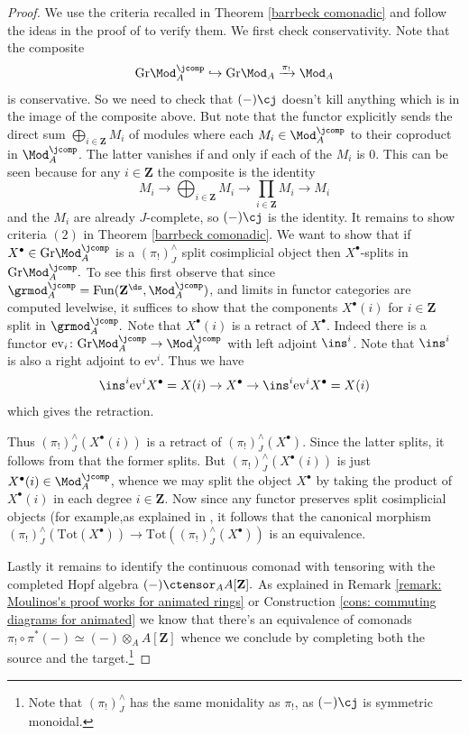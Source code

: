 \documentclass[10pt,reqno]{amsart}
\numberwithin{equation}{section}
\newcommand{\ZZ}{\mathbf{Z}}
\newcommand{\Gr}{\mathrm{Gr}}
\newcommand{\ev}{\mathrm{ev}}
\newcommand{\into}{\hookrightarrow}
\newcommand{\Tot}{\mathrm{Tot}}
\newcommand{\pij}{(\pi_!)^\wedge_J}
\begin{document}
\begin{proof}

    We use the criteria recalled in Theorem \ref{barrbeck comonadic} and follow the ideas in the proof of \cite[Proposition 4.2]{Moulinos2021GeometryOfFiltrations} to verify them.
    We first check conservativity. Note that the composite $$\Gr\Mod_A^\jcomp\into \Gr\Mod_A\xrightarrow{\pi_!}\Mod_A$$ is conservative. So we need to check that $(-)\cj$ doesn't kill anything which is in the image of the composite above. But note that the functor explicitly sends the direct sum $\bigoplus_{i\in \ZZ} M_i$ of modules where each $M_i\in \Mod_A^\jcomp$ to their coproduct in $\Mod_A^\jcomp$. The latter vanishes if and only if each of the $M_i$ is $0.$ This can be seen because for any $i\in \ZZ$ the composite is the identity
    $$M_i\to \bigoplus_{i\in \ZZ} M_i\to \prod_{i\in \ZZ}M_i\to M_i$$ and the $M_i$ are already $J$-complete, so $(-)\cj$ is the identity.
    It remains to show criteria $(2)$ in Theorem \ref{barrbeck comonadic}. We want to show that if $X^\bullet\in \Gr\Mod_A^\jcomp$ is a $\pij$ split cosimplicial object then $X^\bullet$-splits in $\Gr\Mod_A^\jcomp.$ To see this first observe that since $\grmod^\jcomp_A=\mathrm{Fun}(\ZZ^\ds,\Mod_A^\jcomp)$, and limits in functor categories are computed levelwise, it suffices to show that the components $X^\bullet(i)$ for $i\in \ZZ$ split in $\grmod_A^\jcomp.$
    Note that $X^\bullet(i)$ is a retract of $X^\bullet$. Indeed there is a functor $\ev_i\colon \Gr\Mod_A^\jcomp\to \Mod^\jcomp_A$ with left adjoint $\ins^i$. Note that $\ins^i$ is also a right adjoint to $\ev^i.$ Thus we have $$\ins^i \ev^i X^\bullet=X(i) \to X^\bullet \to \ins^i\ev^i X^\bullet=X(i)$$ which gives the retraction.

    Thus $\pij(X^\bullet(i))$ is a retract of $\pij(X^\bullet).$ Since the latter splits, it follows from \cite[Corollary 4.7.2.13]{HA} that the former splits. But $\pij(X^\bullet(i))$ is just $X^\bullet(i)\in \Mod_A^\jcomp$, whence we may split the object $X^\bullet$ by taking the product of $X^\bullet(i)$ in each degree $i\in \ZZ$. 
    Now since any functor preserves split cosimplicial objects (for example,as explained in \cite[Example 3.11]{galoisgroup}, it follows that the canonical morphism $\pij(\Tot(X^\bullet))\to \Tot(\pij(X^\bullet))$ is an equivalence. 

    Lastly it remains to identify the continuous comonad with tensoring with the completed Hopf algebra $(-)\ctensor_A A[\ZZ].$ As explained in Remark \ref{remark: Moulinos's proof works for animated rings} or Construction \ref{cons: commuting diagrams for animated} we know that there's an equivalence of comonads $\pi_!\circ \pi^*(-)\simeq (-)\otimes_A A[\ZZ]$ whence we conclude by completing both the source and the target.\footnote{Note that $\pij$ has the same monidality as $\pi_!$, as $(-)\cj$ is symmetric monoidal.}
\end{proof}
\end{document}
